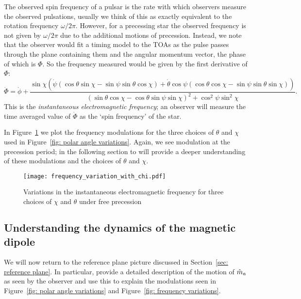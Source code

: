 \documentclass[../full_thesis/full_thesis.tex]{subfiles}
\begin{document}
The observed spin frequency of a pulsar is the rate with which observers measure the
observed pulsations, usually we think of this as exactly equivalent to the
rotation frequency $\omega/2\pi$. However, for a precessing star the observed
frequency is not given by $\omega/2\pi$ due to the additional motions of precession.
Instead, we note that the observer would fit a timing model to the TOAs as the
pulse passes through the plane containing them and the angular momentum vector,
the phase of which is $\Phi$. So the frequency measured would be given by the
first derivative of $\Phi$:
\begin{equation}
\dot{\Phi} = \dot{\phi}
+ \frac{\sin\chi \left(
\dot{\psi} (\cos\theta\sin\chi - \sin \psi \sin \theta \cos\chi) +
\dot{\theta} \cos\psi (\cos\theta\cos\chi - \sin \psi \sin \theta \sin\chi)\right)
}{(\sin\theta \cos \chi - \cos \theta \sin \psi \sin \chi)^{2} + \cos^{2}\psi \sin^{2} \chi}.
\label{eqn: Phi_dot}
\end{equation}
This is the \emph{instantaneous electromagnetic frequency}; an observer
will measure the time averaged value of $\dot{\Phi}$ as the `spin frequency' of
the star.

In Figure~\ref{fig: frequency variations} we plot the frequency modulations for
the three choices of $\theta$ and $\chi$ used in Figure~\ref{fig: polar angle variations}.
Again, we see modulation at the precession period; in the following section to
will provide a deeper understanding of these modulations and the choices of
$\theta$ and $\chi$.
\begin{figure}[htb]
\centering
  \texttt{[image: frequency\_variation\_with\_chi.pdf]}
\caption{Variations in the instantaneous electromagnetic frequency for three choices
of $\chi$ and $\theta$ under free precession}
\label{fig: frequency variations}
\end{figure}


\subsection{Understanding the dynamics of the magnetic dipole}
\label{sec: understanding the motion of m}

We will now return to the reference plane picture discussed in Section~\ref{sec:
reference plane}. In particular, provide a detailed description of
the motion of $\hat{m}_a$ as seen by the observer and use this to explain the
modulations seen in Figure~\ref{fig: polar angle variations} and Figure~\ref{fig:
frequency variations}.
\end{document}
